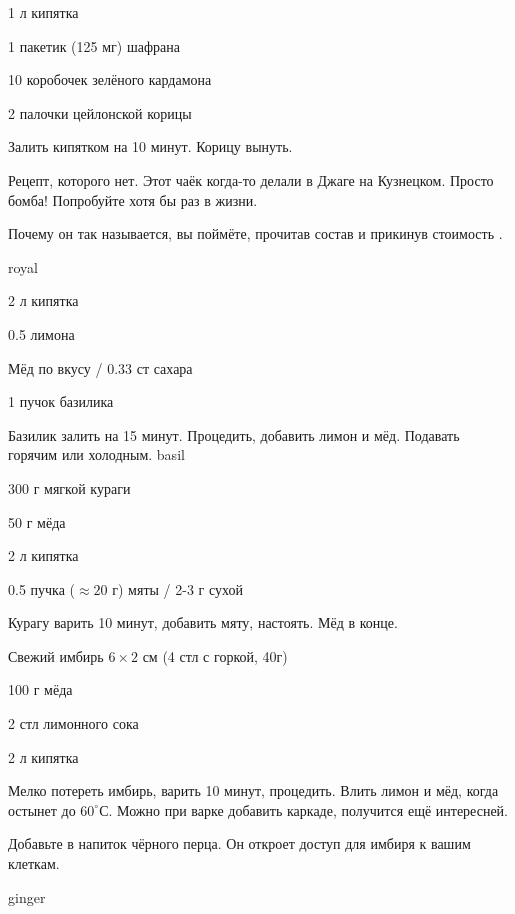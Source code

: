 {
\item  1 л кипятка
}{
\item 1 пакетик (125 мг) шафрана 
\item 10 коробочек зелёного кардамона
\item 2 палочки цейлонской корицы
}{
Залить кипятком на 10 минут. Корицу вынуть.
}{
\begin{advice}
\item Рецепт, которого нет. Этот чаёк когда-то делали в Джаге на Кузнецком. Просто бомба! Попробуйте хотя бы раз в жизни. 
 \item Почему он так называется, вы поймёте, прочитав состав и прикинув стоимость \faSmileO.
\end{advice}}{royal}





{
\item 2 л кипятка
\item 0.5 лимона 
\item Мёд по вкусу / 0.33 ст сахара
}{
\item 1 пучок базилика
}{
Базилик залить на 15 минут. Процедить, добавить лимон и мёд. Подавать горячим или холодным.
}{}{basil}





{
\item 300 г мягкой кураги
\item 50 г мёда
\item 2 л кипятка
}{
\item 0.5 пучка ($\approx 20$ г) мяты  / 2-3 г сухой
}{
Курагу варить 10 минут, добавить мяту, настоять. Мёд в конце.
}{}{}




{
\item Свежий имбирь $6\times 2$ см (4 стл с горкой, 40г)
\item 100 г мёда
\item 2 стл лимонного сока
\item 2 л кипятка
}{
\item[] 
}{
Мелко потереть имбирь, варить 10 минут, процедить. Влить лимон и мёд, когда остынет до $60^{\circ}$С. Можно при варке добавить каркаде, получится ещё интересней.

}{
\begin{advice}
\item Добавьте в напиток чёрного перца. Он откроет доступ для имбиря к вашим клеткам.
\end{advice}}{ginger}


% 
% 
% 
% 
